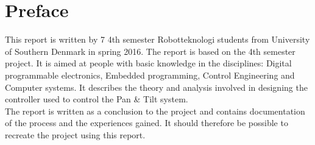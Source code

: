 \section*{Preface}

This report is written by 7 4th semester Robotteknologi students from University of Southern Denmark in spring 2016. The report is based on the 4th semester project.
It is aimed at people with basic knowledge in the disciplines: Digital programmable electronics, Embedded programming, Control Engineering and Computer systems.
It describes the theory and analysis involved in designing the controller used to control the Pan \& Tilt system.\\
The report is written as a conclusion to the project and contains documentation of the process and the experiences gained. It should therefore be possible to recreate the project using this report.